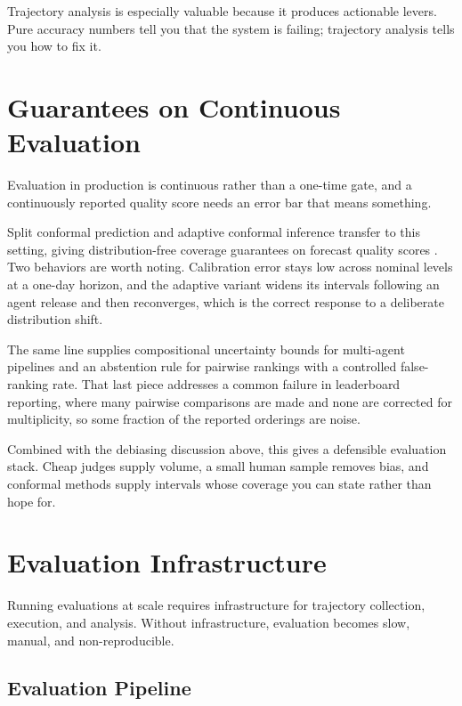 Trajectory analysis is especially valuable because it produces actionable levers. Pure accuracy numbers tell you that the system is failing; trajectory analysis tells you how to fix it.

\section{Guarantees on Continuous Evaluation}

Evaluation in production is continuous rather than a one-time gate, and a
continuously reported quality score needs an error bar that means something.

Split conformal prediction and adaptive conformal inference transfer to this
setting, giving distribution-free coverage guarantees on forecast quality scores
\cite{conformaleval2026}. Two behaviors are worth noting. Calibration error stays
low across nominal levels at a one-day horizon, and the adaptive variant widens
its intervals following an agent release and then reconverges, which is the
correct response to a deliberate distribution shift.

The same line supplies compositional uncertainty bounds for multi-agent
pipelines and an abstention rule for pairwise rankings with a controlled
false-ranking rate. That last piece addresses a common failure in leaderboard
reporting, where many pairwise comparisons are made and none are corrected for
multiplicity, so some fraction of the reported orderings are noise.

Combined with the debiasing discussion above, this gives a defensible evaluation
stack. Cheap judges supply volume, a small human sample removes bias, and
conformal methods supply intervals whose coverage you can state rather than hope
for.

\section{Evaluation Infrastructure}

Running evaluations at scale requires infrastructure for trajectory collection, execution, and analysis. Without infrastructure, evaluation becomes slow, manual, and non-reproducible.

\subsection{Evaluation Pipeline}

